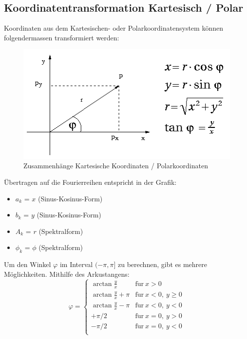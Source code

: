 \subsection{Koordinatentransformation Kartesisch / Polar}

Koordinaten aus dem Kartesischen- oder Polarkoordinatensystem können
folgendermassen transformiert werden:

\begin{figure}[H]
    \centering
    \includegraphics[scale=0.5]{pictures/koordinatentransformation.png}
    \caption{Zusammenhänge Kartesische Koordinaten / Polarkoordinaten}
\end{figure}

Übertragen auf die Fourierreihen entspricht in der Grafik:
\begin{itemize}
    \item $a_k$ = $x$ (Sinus-Kosinus-Form)
    \item $b_k$ = $y$ (Sinus-Kosinus-Form)
    \item $A_k$ = $r$ (Spektralform)
    \item $\phi_k$ = $\phi$ (Spektralform)
\end{itemize}

Um den Winkel $\varphi$ im Interval $(-\pi, \pi]$ zu berechnen, gibt es mehrere
Möglichkeiten. Mithilfe des Arkustangens:
$$\varphi = \begin{cases}
    \arctan\frac{y}{x} & \mathrm{f\ddot ur}\ x > 0\\
    \arctan\frac{y}{x} + \pi & \mathrm{f\ddot ur}\ x < 0,\ y \geq 0\\
    \arctan\frac{y}{x} - \pi & \mathrm{f\ddot ur}\ x < 0,\ y < 0\\
    +\pi/2 & \mathrm{f\ddot ur}\ x = 0,\ y > 0\\
    -\pi/2 & \mathrm{f\ddot ur}\ x = 0,\ y < 0\\
\end{cases}$$

